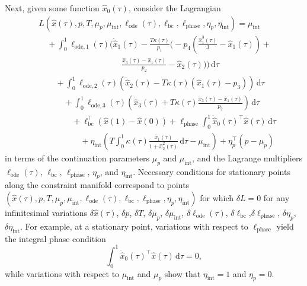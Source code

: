Next, given some function $\hat{x}_0(\tau)$, consider the Lagrangian
\begin{align}
&L\left(\hat{x}(\tau),p,T,\mu_p,\mu_\mathrm{int},\ell_\mathrm{ode}(\tau),\ell_\mathrm{bc},\ell_\mathrm{phase},\eta_p,\eta_\mathrm{int}\right)=\mu_\mathrm{int}\nonumber\\
&\quad +\int_0^1 \ell_{\mathrm{ode},1}(\tau)\bigg(\dot{\hat{x}}_1(\tau)-\frac{T\kappa(\tau)}{p_1}\bigg(-p_4\left(\frac{\hat{x}_1^3(\tau)}{3}-\hat{x}_1(\tau)\right)+\nonumber\\
&\qquad\qquad\qquad\qquad\qquad\frac{\hat{x}_3(\tau)-\hat{x}_1(\tau)}{p_2}-\hat{x}_2(\tau)\bigg)\bigg)\,\mathrm{d}\tau\nonumber\\
&\quad\quad + \int_0^1\ell_{\mathrm{ode},2}(\tau)\left(\dot{\hat{x}}_2(\tau)-T\kappa(\tau)\left(\hat{x}_1(\tau)-p_3\right)\right)\,\mathrm{d}\tau\nonumber\\
&\quad\quad\quad+\int_0^1\ell_{\mathrm{ode},3}(\tau)\left(\dot{\hat{x}}_3(\tau)+T\kappa(\tau)\frac{\hat{x}_3(\tau)-\hat{x}_1(\tau)}{p_2}\right)\,\mathrm{d}\tau\nonumber\\
&\quad\quad\quad\quad +\ell_\mathrm{bc}^\top\left(\hat{x}(1)-\hat{x}(0)\right)+\ell_\mathrm{phase}\int_0^1\dot{\hat{x}}_0(\tau)^\top\hat{x}(\tau)\,\mathrm{d}\tau\nonumber\\
&\quad\quad\quad\quad\quad +\eta_\mathrm{int}\left(T\int_0^1 \kappa(\tau)\frac{\hat{x}_1(\tau)}{1+\hat{x}_2^2(\tau)}\,\mathrm{d}\tau-\mu_\mathrm{int}\right)+\eta_p^\top\left(p-\mu_p\right)
\end{align}
in terms of the continuation parameters $\mu_p$ and $\mu_\mathrm{int}$, and the Lagrange multipliers $\ell_\mathrm{ode}(\tau)$, $\ell_\mathrm{bc}$, $\ell_\mathrm{phase}$, $\eta_p$, and $\eta_\mathrm{int}$. Necessary conditions for stationary points along the constraint manifold correspond to points $\left(\hat{x}(\tau),p,T,\mu_p,\mu_\mathrm{int},\ell_\mathrm{ode}(\tau),\ell_\mathrm{bc},\ell_\mathrm{phase},\eta_p,\eta_\mathrm{int}\right)$ for which $\delta L=0$ for any infinitesimal variations $\delta \hat{x}(\tau)$, $\delta p$, $\delta T$, $\delta\mu_p$, $\delta\mu_\mathrm{int}$, $\delta\ell_\mathrm{ode}(\tau)$, $\delta\ell_\mathrm{bc}$,$\delta\ell_\mathrm{phase}$, $\delta\eta_p$, $\delta\eta_\mathrm{int}$. For example, at a stationary point, variations with respect to $\ell_\mathrm{phase}$ yield the integral phase condition
\begin{equation}
\int_0^1\dot{\hat{x}}_0(\tau)^\top\hat{x}(\tau)\,\mathrm{d}\tau=0,
\end{equation}
while variations with respect to $\mu_\mathrm{int}$ and $\mu_p$ show that $\eta_\mathrm{int}=1$ and $\eta_p=0$. 

